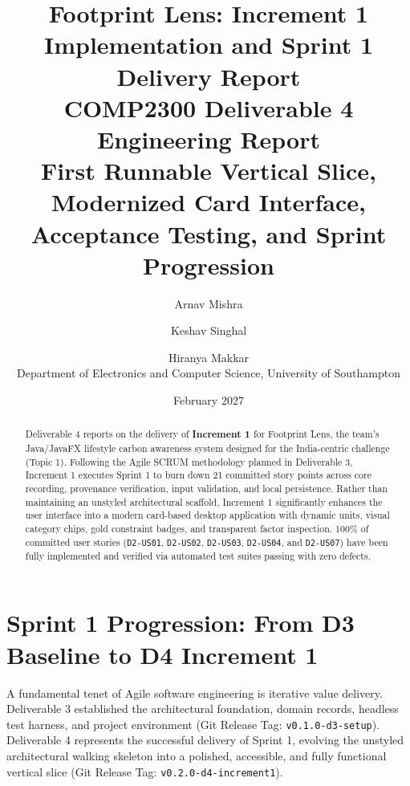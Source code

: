 \documentclass[12pt,a4paper]{article}
\title{\textbf{Footprint Lens: Increment 1 Implementation and Sprint 1 Delivery Report}\\[0.4em]
  \large COMP2300 Deliverable 4 Engineering Report\\
  \normalsize First Runnable Vertical Slice, Modernized Card Interface, Acceptance Testing, and Sprint Progression}
\author{Arnav Mishra \and Keshav Singhal \and Hiranya Makkar\\[0.4em]
  \small Department of Electronics and Computer Science, University of Southampton}
\date{February 2027}
\newcommand{\code}[1]{\texttt{#1}}
\begin{document}
\maketitle

\begin{abstract}
Deliverable 4 reports on the delivery of \textbf{Increment 1} for Footprint Lens, the team's Java/JavaFX lifestyle carbon awareness system designed for the India-centric challenge (Topic 1). Following the Agile SCRUM methodology planned in Deliverable 3, Increment 1 executes Sprint 1 to burn down 21 committed story points across core recording, provenance verification, input validation, and local persistence. Rather than maintaining an unstyled architectural scaffold, Increment 1 significantly enhances the user interface into a modern card-based desktop application with dynamic units, visual category chips, gold constraint badges, and transparent factor inspection. 100\% of committed user stories (\code{D2-US01}, \code{D2-US02}, \code{D2-US03}, \code{D2-US04}, and \code{D2-US07}) have been fully implemented and verified via automated test suites passing with zero defects.
\end{abstract}

\section{Sprint 1 Progression: From D3 Baseline to D4 Increment 1}

A fundamental tenet of Agile software engineering is iterative value delivery. Deliverable 3 established the architectural foundation, domain records, headless test harness, and project environment (Git Release Tag: \code{v0.1.0-d3-setup}). Deliverable 4 represents the successful delivery of Sprint 1, evolving the unstyled architectural walking skeleton into a polished, accessible, and fully functional vertical slice (Git Release Tag: \code{v0.2.0-d4-increment1}).
\end{document}
